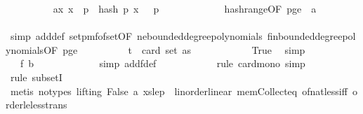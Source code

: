\begin{isabellebody}
\ \ \ \ \ \ \ \ \isamarkupfalse%
\ a{\isacharcolon}{\kern0pt}{\isachardoublequoteopen}{\isasymAnd}x{\isachardot}{\kern0pt}\ x\ {\isacharless}{\kern0pt}\ p\ {\isasymLongrightarrow}\ hash\ p\ x\ {\isasymomega}\ {\isacharless}{\kern0pt}\ p{\isachardoublequoteclose}\ \isanewline
\ \ \ \ \ \ \ \ \ \ \isamarkupfalse%
\ hash{\isacharunderscore}{\kern0pt}range{\isacharbrackleft}{\kern0pt}OF\ p{\isacharunderscore}{\kern0pt}ge{\isacharunderscore}{\kern0pt}{}{\isacharbrackright}{\kern0pt}\ \ a{\isacharunderscore}{\kern0pt}{}\isanewline
\ \ \ \ \ \ \ \ \ \ \isamarkupfalse%
\ {\isacharparenleft}{\kern0pt}simp\ add{\isacharcolon}{\kern0pt}{\isasymOmega}def\ set{\isacharunderscore}{\kern0pt}pmf{\isacharunderscore}{\kern0pt}of{\isacharunderscore}{\kern0pt}set{\isacharbrackleft}{\kern0pt}OF\ ne{\isacharunderscore}{\kern0pt}bounded{\isacharunderscore}{\kern0pt}degree{\isacharunderscore}{\kern0pt}polynomials\ fin{\isacharunderscore}{\kern0pt}bounded{\isacharunderscore}{\kern0pt}degree{\isacharunderscore}{\kern0pt}polynomials{\isacharbrackleft}{\kern0pt}OF\ p{\isacharunderscore}{\kern0pt}ge{\isacharunderscore}{\kern0pt}{}{\isacharbrackright}{\kern0pt}{\isacharbrackright}{\kern0pt}{\isacharparenright}{\kern0pt}\isanewline
\ \ \ \ \ \ \ \ \isamarkupfalse%
\ {\isachardoublequoteopen}t\ {\isasymle}\ card\ {\isacharparenleft}{\kern0pt}set\ as{\isacharparenright}{\kern0pt}{\isachardoublequoteclose}\isanewline
\ \ \ \ \ \ \ \ \ \ \isamarkupfalse%
\ True\ \isamarkupfalse%
\ simp\isanewline
\ \ \ \ \ \ \ \ \isamarkupfalse%
\ \isamarkupfalse%
\ {\isachardoublequoteopen}{\isachardot}{\kern0pt}{\isachardot}{\kern0pt}{\isachardot}{\kern0pt}\ {\isasymle}\ f\ b\ {\isasymomega}{\isachardoublequoteclose}\isanewline
\ \ \ \ \ \ \ \ \ \ \isamarkupfalse%
\ {\isacharparenleft}{\kern0pt}simp\ add{\isacharcolon}{\kern0pt}f{\isacharunderscore}{\kern0pt}def{\isacharparenright}{\kern0pt}\isanewline
\ \ \ \ \ \ \ \ \ \ \isamarkupfalse%
\ {\isacharparenleft}{\kern0pt}rule\ card{\isacharunderscore}{\kern0pt}mono{\isacharcomma}{\kern0pt}\ simp{\isacharparenright}{\kern0pt}\isanewline
\ \ \ \ \ \ \ \ \ \ \isamarkupfalse%
\ {\isacharparenleft}{\kern0pt}rule\ subsetI{\isacharparenright}{\kern0pt}\isanewline
\ \ \ \ \ \ \ \ \ \ \isamarkupfalse%
\ {\isacharparenleft}{\kern0pt}metis\ {\isacharparenleft}{\kern0pt}no{\isacharunderscore}{\kern0pt}types{\isacharcomma}{\kern0pt}\ lifting{\isacharparenright}{\kern0pt}\ False\ a\ xs{\isacharunderscore}{\kern0pt}le{\isacharunderscore}{\kern0pt}p\ \ linorder{\isacharunderscore}{\kern0pt}linear\ mem{\isacharunderscore}{\kern0pt}Collect{\isacharunderscore}{\kern0pt}eq\ of{\isacharunderscore}{\kern0pt}nat{\isacharunderscore}{\kern0pt}less{\isacharunderscore}{\kern0pt}iff\ order{\isacharunderscore}{\kern0pt}le{\isacharunderscore}{\kern0pt}less{\isacharunderscore}{\kern0pt}trans{\isacharparenright}{\kern0pt}\isanewline

\end{isabellebody}
